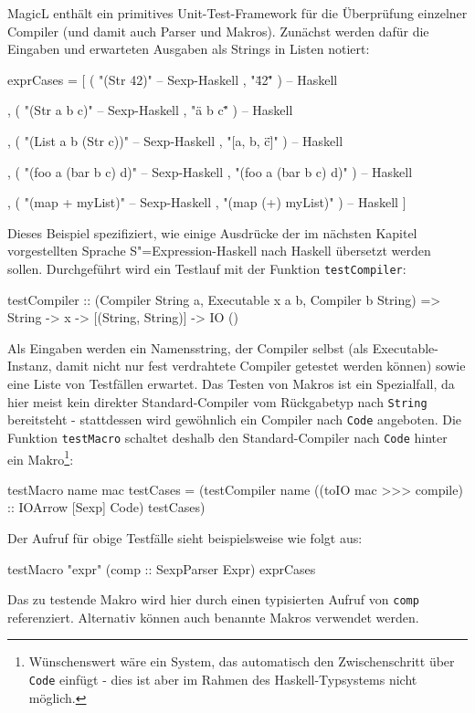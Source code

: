 \documentclass[11pt, a4paper, bibgerm]{scrbook}
\newcommand\icode[1]{\lstinline?#1?}
\newcommand{\sexp}{S"=Expression}
\begin{document}
MagicL enthält ein primitives Unit-Test-Framework für die Überprüfung
einzelner Compiler (und damit auch Parser und Makros). Zunächst werden
dafür die Eingaben und erwarteten Ausgaben als Strings in Listen
notiert:
\begin{code}
exprCases = [ ( "(Str 42)"                    -- Sexp-Haskell 
                , "\"42\"" )                  -- Haskell 

              , ( "(Str a  b c)"              -- Sexp-Haskell 
                , "\"a b c\"" )               -- Haskell 

              , ( "(List a b (Str c))"        -- Sexp-Haskell 
                , "[a, b, \"c\"]" )           -- Haskell 

              , ( "(foo a (bar b c) d)"       -- Sexp-Haskell 
                , "(foo a (bar b c) d)" )     -- Haskell 

              , ( "(map + myList)"            -- Sexp-Haskell 
                , "(map (+) myList)" )        -- Haskell 
              ]  
\end{code}
Dieses Beispiel spezifiziert, wie einige Ausdrücke der im nächsten
Kapitel vorgestellten Sprache \sexp{}-Haskell nach Haskell übersetzt
werden sollen. Durchgeführt wird ein Testlauf mit der Funktion
\icode{testCompiler}:
\begin{code} 
testCompiler :: 
  (Compiler String a, Executable x a b, Compiler b String) => 
  String -> x -> [(String, String)] -> IO ()
\end{code}
Als Eingaben werden ein Namensstring, der Compiler selbst (als
Executable-Instanz, damit nicht nur fest verdrahtete Compiler getestet
werden können) sowie eine Liste von Testfällen erwartet. Das Testen
von Makros ist ein Spezialfall, da hier meist kein direkter
Standard-Compiler vom Rückgabetyp nach \icode{String} bereitsteht -
stattdessen wird gewöhnlich ein Compiler nach \icode{Code}
angeboten. Die Funktion \icode{testMacro} schaltet deshalb den
Standard-Compiler nach \icode{Code} hinter ein
Makro\footnote{Wünschenswert wäre ein System, das automatisch den
  Zwischenschritt über \icode{Code} einfügt - dies ist aber im Rahmen
  des Haskell-Typsystems nicht möglich.}:
\begin{code}
testMacro name mac testCases = 
  (testCompiler name 
                ((toIO mac >>> compile) :: IOArrow [Sexp] Code)
                testCases)
\end{code}
Der Aufruf für obige Testfälle sieht beispielsweise wie folgt aus:
\begin{code}
testMacro "expr" (comp :: SexpParser Expr) exprCases  
\end{code}
Das zu testende Makro wird hier durch einen typisierten Aufruf von
\icode{comp} referenziert. Alternativ können auch benannte Makros
verwendet werden.
\end{document}
